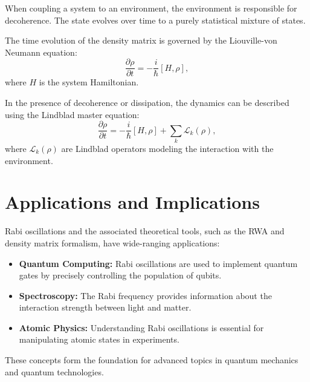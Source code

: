 When coupling a system to an environment, the environment is responsible for decoherence.
The state evolves over time to a purely statistical mixture of states.


The time evolution of the density matrix is governed by the Liouville-von Neumann equation:
\begin{equation}
    \frac{\partial \rho}{\partial t} = -\frac{i}{\hbar} [H, \rho],
    \label{eq:Liouville}
\end{equation}
where \(H\) is the system Hamiltonian.

In the presence of decoherence or dissipation, the dynamics can be described using the Lindblad master equation:
\begin{equation}
    \frac{\partial \rho}{\partial t} = -\frac{i}{\hbar} [H, \rho] + \sum_k \mathcal{L}_k(\rho),
    \label{eq:Lindblad}
\end{equation}
where \(\mathcal{L}_k(\rho)\) are Lindblad operators modeling the interaction with the environment.


\section{Applications and Implications}

Rabi oscillations and the associated theoretical tools, such as the RWA and density matrix formalism, have wide-ranging applications:
\begin{itemize}
    \item \textbf{Quantum Computing:} Rabi oscillations are used to implement quantum gates by precisely controlling the population of qubits.
    \item \textbf{Spectroscopy:} The Rabi frequency provides information about the interaction strength between light and matter.
    \item \textbf{Atomic Physics:} Understanding Rabi oscillations is essential for manipulating atomic states in experiments.
\end{itemize}

These concepts form the foundation for advanced topics in quantum mechanics and quantum technologies.